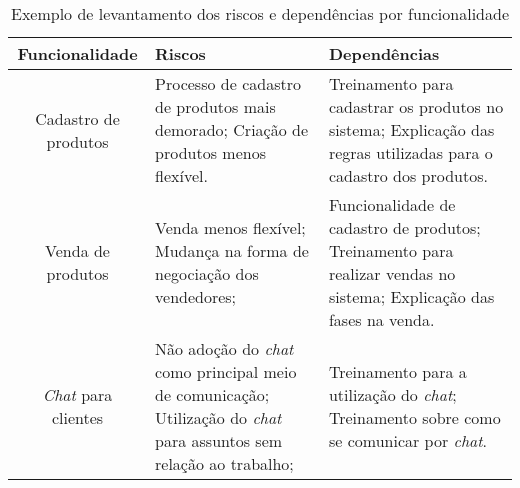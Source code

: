       \begin{table}[h!]
        \centering
        \begin{tabular}{|c|p{4cm}|p{6cm}|}
          \hline
          \textbf{Funcionalidade} &
          \textbf{Riscos}  &
          \textbf{Dependências}
          \\ \hline
          Cadastro de produtos &
          Processo de cadastro de produtos mais demorado; \newline
          Criação de produtos menos flexível. &
          Treinamento para cadastrar os produtos no sistema;\newline
          Explicação das regras utilizadas para o cadastro dos produtos.
          \\ \hline
          Venda de produtos &
          Venda menos flexível; \newline
          Mudança na forma de negociação dos vendedores; &
          Funcionalidade de cadastro de produtos; \newline
          Treinamento para realizar vendas no sistema; \newline
          Explicação das fases na venda.
          \\ \hline
          \textit{Chat} para clientes &
          Não adoção do \textit{chat} como principal meio de comunicação; \newline
          Utilização do \textit{chat} para assuntos sem relação ao trabalho; &
          Treinamento para a utilização do \textit{chat}; \newline
          Treinamento sobre como se comunicar por \textit{chat}.
          \\ \hline
        \end{tabular}
        \caption{Exemplo de levantamento dos riscos e dependências por funcionalidade}
        \label{Tabela:3}
      \end{table}

